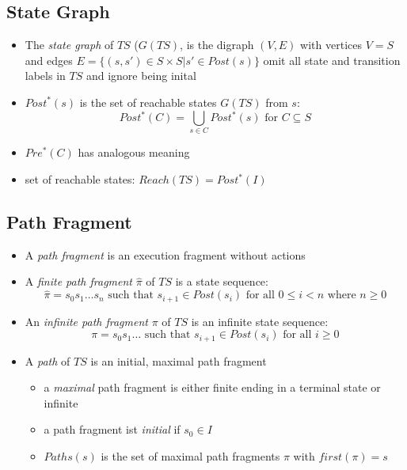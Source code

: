 \documentclass[a4paper, 10pt]{article}
\begin{document}
\subsection*{State Graph}
\begin{shaded}
\begin{itemize}
    \item The \emph{state graph} of $TS$ ($G(TS)$, is the digraph $(V,E)$ with vertices $V=S$ and edges $E=\{(s,s')\in S\times S | s'\in Post(s)\}$ \follows omit all state and transition labels in $TS$ and ignore being inital
    \item $Post^*(s)$ is the set of reachable states $G(TS)$ from $s$:
    \[ Post^*(C)=\bigcup_{s\in C}Post^*(s) \textrm{ for } C \subseteq S \]
    \item $Pre^*(C)$ has analogous meaning
    \item set of reachable states: $Reach(TS)=Post^*(I)$
\end{itemize}
\end{shaded}

\subsection*{Path Fragment}
\begin{shaded}
    \begin{itemize}
        \item A \emph{path fragment} is an execution fragment without actions
        \item A \emph{finite path fragment} $\hat{\pi}$ of $TS$ is a state sequence:
        \[ \hat{\pi} = s_0s_1\dots s_n \textrm{ such that } s_{i+1}\in Post(s_i) \textrm{ for all } 0 \leq i<n \textrm{ where } n\geq0 \]
        \item An \emph{infinite path fragment} $\pi$ of $TS$ is an infinite state sequence:
        \[ \pi=s_0s_1\dots \textrm{ such that } s_{i+1}\in Post(s_i) \textrm{ for all } i\geq0 \]
        \item A \emph{path} of $TS$ is an initial, maximal path fragment
        \begin{itemize}
            \item a \emph{maximal} path fragment is either finite ending in a terminal state or infinite
            \item a path fragment ist \emph{initial} if $s_0\in I$
            \item $Paths(s)$ is the set of maximal path fragments $\pi$ with $first(\pi)=s$
        \end{itemize}
    \end{itemize}
\end{shaded}
\begin{center}
\scalebox{1}{}
\end{center}
\end{document}
